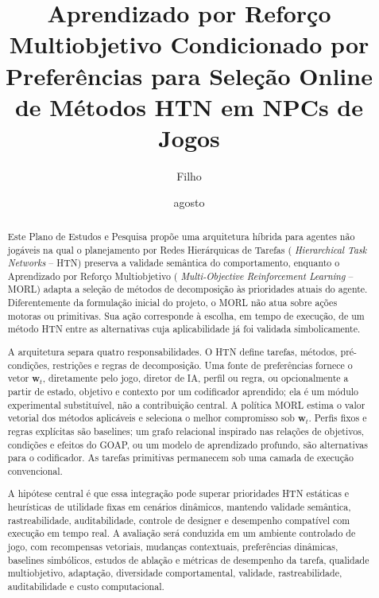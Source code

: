 \documentclass[ppgc,pep,oneside,noabntcite]{infufrgs}
\title{Aprendizado por Reforço Multiobjetivo Condicionado por Preferências para Seleção Online de Métodos HTN em NPCs de Jogos}
\author{Filho}{Anderson G. A. C.}
\date{agosto}{2026}
\begin{document}
\maketitle

\begin{abstract}
Este Plano de Estudos e Pesquisa propõe uma arquitetura híbrida para agentes
não jogáveis na qual o planejamento por Redes Hierárquicas de Tarefas
(
\textit{Hierarchical Task Networks} -- HTN) preserva a validade semântica do
comportamento, enquanto o Aprendizado por Reforço Multiobjetivo
(
\textit{Multi-Objective Reinforcement Learning} -- MORL) adapta a seleção de
métodos de decomposição às prioridades atuais do agente.
Diferentemente da formulação inicial do projeto, o MORL não atua sobre ações
motoras ou primitivas.
Sua ação corresponde à escolha, em tempo de execução, de um método HTN entre as
alternativas cuja aplicabilidade já foi validada simbolicamente.

A arquitetura separa quatro responsabilidades.
O HTN define tarefas, métodos, pré-condições, restrições e regras de
decomposição.
Uma fonte de preferências fornece o vetor $\mathbf{w}_t$, diretamente pelo jogo,
diretor de IA, perfil ou regra, ou opcionalmente a partir de estado, objetivo e
contexto por um codificador aprendido; ela é um módulo experimental
substituível, não a contribuição central.
A política MORL estima o valor vetorial dos métodos aplicáveis e seleciona o
melhor compromisso sob $\mathbf{w}_t$.
Perfis fixos e regras explícitas são baselines; um grafo relacional inspirado
nas relações de objetivos, condições e efeitos do GOAP, ou um modelo de
aprendizado profundo, são alternativas para o codificador.
As tarefas primitivas permanecem sob uma camada de execução convencional.

A hipótese central é que essa integração pode superar prioridades HTN estáticas
e heurísticas de utilidade fixas em cenários dinâmicos, mantendo validade
semântica, rastreabilidade, auditabilidade, controle de designer e desempenho compatível com
execução em tempo real.
A avaliação será conduzida em um ambiente controlado de jogo, com recompensas
vetoriais, mudanças contextuais, preferências dinâmicas, baselines simbólicos,
estudos de ablação e métricas de desempenho da tarefa, qualidade multiobjetivo,
adaptação, diversidade comportamental, validade, rastreabilidade, auditabilidade e custo
computacional.
\end{abstract}
\end{document}
